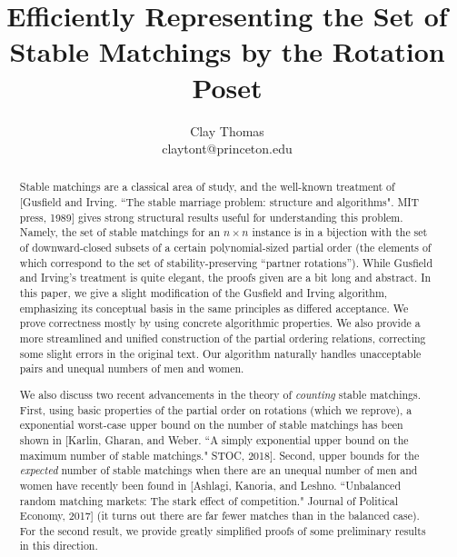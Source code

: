\documentclass[12pt]{article}
\begin{document}
 
\title{
  Efficiently Representing the Set of Stable Matchings by the Rotation Poset
}
\author{
  Clay Thomas\\
  claytont@princeton.edu
}
\maketitle

\begin{abstract}
  Stable matchings are a classical area of study, and
  the well-known treatment of [Gusfield and Irving. ``The stable
    marriage problem: structure and algorithms". MIT press, 1989]
  gives strong structural results useful for understanding this problem.
  Namely, the set of stable matchings for an $n\times n$
  instance is in a bijection with the set of downward-closed subsets of a
  certain polynomial-sized partial order (the elements of which correspond to
  the set of stability-preserving ``partner rotations'').
  While Gusfield and Irving's treatment is quite elegant,
  the proofs given are a bit long and abstract.
  In this paper, we give a slight modification of
  the Gusfield and Irving algorithm, emphasizing its conceptual basis
  in the same principles as differed acceptance.
  We prove correctness mostly by using concrete algorithmic properties.
  We also provide a more streamlined and
  unified construction of the partial ordering relations, correcting some
  slight errors in the original text.
  Our algorithm naturally handles unacceptable pairs
  and unequal numbers of men and women.

  We also discuss two recent advancements in the theory of \emph{counting}
  stable matchings. First, using basic properties of the partial
  order on rotations (which we reprove), a exponential worst-case upper bound on the
  number of stable matchings has been shown in 
  [Karlin, Gharan, and Weber. ``A simply exponential upper bound on the maximum
    number of stable matchings." STOC, 2018].
  Second, upper bounds for the \emph{expected}
  number of stable matchings when there are an unequal number of men and women
  have recently been found in [Ashlagi, Kanoria, and Leshno.
    ``Unbalanced random matching markets: The stark effect of competition."
    Journal of Political Economy, 2017]
  (it turns out there are far fewer matches than in the balanced case).
  For the second result, we provide greatly simplified proofs of some
  preliminary results in this direction.
\end{abstract}
\end{document}
